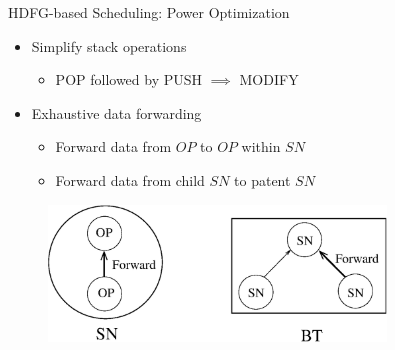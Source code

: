 \documentclass{beamer}
\begin{document}
\begin{CJK}{UTF8}{bkai}
            \begin{frame}{HDFG-based Scheduling: Power Optimization}
                \begin{itemize}
                    \pause
                    \item {
                            Simplify stack operations
                            \begin{itemize}
                                \item POP followed by PUSH $\implies$ MODIFY
                            \end{itemize}
                        }
                    \pause
                    \item {
                            Exhaustive data forwarding
                            \begin{itemize}
                                \item Forward data from $OP$ to $OP$ within $SN$
                                \item Forward data from child $SN$ to patent $SN$
                            \end{itemize}
                        }
                \end{itemize}
                \pause
                \begin{figure}[!ht] 
                    \centering
                    \includegraphics[width=0.8\textwidth]{./figs/power_opt}
                    \label{fig:archi}
                \end{figure}
            \end{frame}

\end{CJK}
\end{document}
